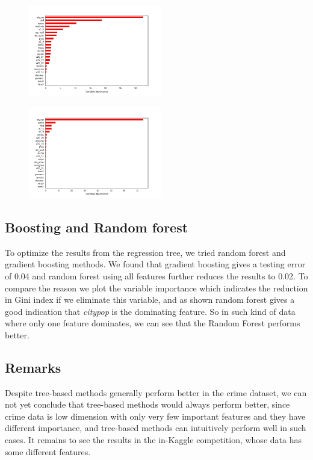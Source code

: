 \documentclass{article}
\begin{document}
\begin{figure}
\centering
\begin{minipage}{.5\textwidth}
  \centering
  \includegraphics[width=.8\linewidth,height=4cm]{crime_boosttu}
  \label{fig:test1}
\end{minipage}%
\begin{minipage}{.5\textwidth}
  \centering
  \includegraphics[width=.8\linewidth,height=4cm]{crime_randtu}
  \label{fig:test2}
\end{minipage}
\end{figure}


\subsection{Boosting and Random forest}
To optimize the results from the regression tree, we tried random forest and gradient boosting methods. We found that gradient boosting gives a testing error of 0.04 and random forest using all features further reduces the results to 0.02. To compare the reason we plot the variable importance which indicates the reduction in Gini index if we eliminate this variable, and as shown random forest gives a good indication that \textit{citypop} is the dominating feature. So in such kind of data where only one feature dominates, we can see that the Random Forest performs better.

\subsection{Remarks}
Despite tree-based methods generally perform better in the crime dataset, we can not yet conclude that tree-based methods would always perform better, since crime data is low dimension with only very few important features and they have different importance, and tree-based methods can intuitively perform well in such cases. It remains to see the results in the in-Kaggle competition, whose data has some different features.
\end{document}
